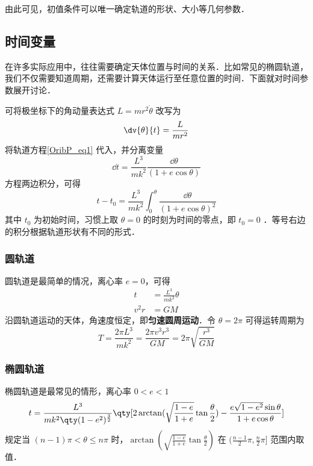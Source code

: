 由此可见，初值条件可以唯一确定轨道的形状、大小等几何参数．

\subsection{时间变量}
在许多实际应用中，往往需要确定天体位置与时间的关系．比如常见的椭圆轨道，我们不仅需要知道周期，还需要计算天体运行至任意位置的时间．下面就对时间参数展开讨论．

可将极坐标下的角动量表达式 $ L  = mr^2\dot{\theta}$ 改写为
\begin{equation} 
\dv{\theta}{t}=\frac{L}{mr^2}
\end{equation}
将轨道方程\autoref{OribP_eq1} 代入，并分离变量
\begin{equation}
\dd{t}=\frac{L^3}{mk^2}\frac{\dd{\theta}}{(1+e\cos\theta)}
\end{equation}
方程两边积分，可得
\begin{equation}\label{OribP_eq11}
t-t_0 = \frac{L^3}{mk^2}\int_0^{\theta} \frac{\dd{\theta}}{(1+e\cos\theta)^2}
\end{equation}
其中 $t_0$ 为初始时间，习惯上取 $\theta=0$ 的时刻为时间的零点，即 $t_0=0$ ．等号右边的积分根据轨道形状有不同的形式．

\subsubsection{圆轨道}
圆轨道是最简单的情况，离心率 $e=0$，可得
\begin{equation}
\begin{aligned}
t &=\frac{L^3}{mk^2}\theta \\
v^2r &=GM 
\end{aligned}
\end{equation}
沿圆轨道运动的天体，角速度恒定，即\textbf{匀速圆周运动}．令 $\theta=2\pi$ 可得运转周期为
\begin{equation}
T=\frac{2\pi L^3}{mk^2}=\frac{2\pi v^3r^3}{GM}=2\pi \sqrt{\frac{r^3}{GM}}
\end{equation}

\subsubsection{椭圆轨道}
椭圆轨道是最常见的情形，离心率 $0<e<1$
\begin{equation}\label{OribP_eq14}
t = \frac{L^3}{mk^2\qty(1-e^2)^{\frac{3}{2}}}\qty[2\arctan(\sqrt{\frac{1-e}{1+e}}\tan\frac{\theta}{2})-\frac{e\sqrt{1-e^2}\sin\theta}{1+e\cos\theta}]
\end{equation}
规定当 $(n-1)\pi<\theta \leqslant n\pi$ 时，$\arctan(\sqrt{\frac{1-e}{1+e}}\tan\frac{\theta}{2})$ 在 $(\frac{n-1}{2}\pi,\frac{n}{2}\pi]$ 范围内取值．

